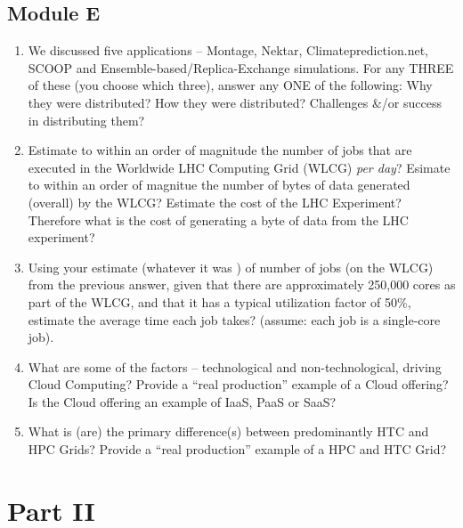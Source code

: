 \documentclass[10pt]{article}
\begin{document}
\subsection{Module E}
 \begin{enumerate}
 \item We discussed five applications -- Montage, Nektar,
   Climateprediction.net, SCOOP and Ensemble-based/Replica-Exchange
   simulations. For any THREE of these (you choose which three),
   answer any ONE of the following: Why they were distributed? How
   they were distributed? Challenges \&/or success in distributing
   them?
 \item Estimate to within an order of magnitude the number of jobs
   that are executed in the Worldwide LHC Computing Grid (WLCG) {\it
     per day}? Esimate to within an order of magnitue the number of
   bytes of data generated (overall) by the WLCG? Estimate the cost of
   the LHC Experiment? Therefore what is the cost of generating a byte
   of data from the LHC experiment? 
 \item Using your estimate (whatever it was ) of number of jobs (on the
   WLCG) from the previous answer, given that there are approximately
   250,000 cores as part of the WLCG, and that it has a typical
   utilization factor of 50\%, estimate the average time each job
   takes? (assume: each job is a single-core job).
 \item What are some of the factors -- technological and
   non-technological, driving Cloud Computing? Provide a ``real
   production'' example of a Cloud offering? Is the Cloud offering 
   an example of IaaS, PaaS or SaaS?
 \item What is (are) the primary difference(s) between predominantly
   HTC and HPC Grids?  Provide a ``real production'' example of a HPC
   and HTC Grid?
\end{enumerate}
\section{Part II}
\end{document}
